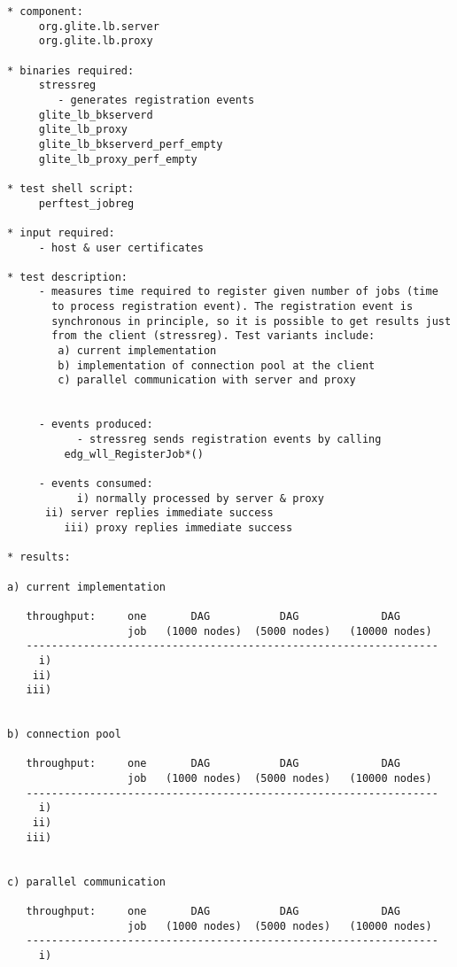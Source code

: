 \begin{verbatim}
* component:
     org.glite.lb.server
     org.glite.lb.proxy

* binaries required:
     stressreg
        - generates registration events
     glite_lb_bkserverd
     glite_lb_proxy
     glite_lb_bkserverd_perf_empty
     glite_lb_proxy_perf_empty
     
* test shell script:
     perftest_jobreg

* input required:
     - host & user certificates

* test description:
     - measures time required to register given number of jobs (time
       to process registration event). The registration event is
       synchronous in principle, so it is possible to get results just
       from the client (stressreg). Test variants include:
	    a) current implementation
	    b) implementation of connection pool at the client
	    c) parallel communication with server and proxy
       
       
     - events produced:
           - stressreg sends registration events by calling
	     edg_wll_RegisterJob*()

     - events consumed:
           i) normally processed by server & proxy
	  ii) server replies immediate success
         iii) proxy replies immediate success

* results:

a) current implementation

   throughput:     one       DAG           DAG             DAG
                   job   (1000 nodes)  (5000 nodes)   (10000 nodes)
   -----------------------------------------------------------------
     i)
    ii)
   iii)


b) connection pool

   throughput:     one       DAG           DAG             DAG
                   job   (1000 nodes)  (5000 nodes)   (10000 nodes)
   -----------------------------------------------------------------
     i)
    ii)
   iii)


c) parallel communication

   throughput:     one       DAG           DAG             DAG
                   job   (1000 nodes)  (5000 nodes)   (10000 nodes)
   -----------------------------------------------------------------
     i)


\end{verbatim}

